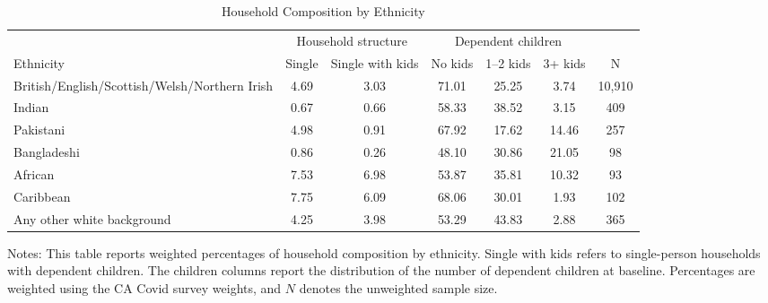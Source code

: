 \begin{table}[htbp]
\centering
\caption{Household Composition by Ethnicity}
\label{tab:ethnicity_household}
\begin{threeparttable}
\footnotesize
\begin{tabular*}{\textwidth}{@{\extracolsep{\fill}}p{5.2cm}cccccc}
\toprule
& \multicolumn{2}{c}{Household structure} & \multicolumn{3}{c}{Dependent children} & \\
\cmidrule(lr){2-3}\cmidrule(lr){4-6}
Ethnicity & Single & Single with kids & No kids & 1--2 kids & 3+ kids & N \\
\midrule
British/English/Scottish/Welsh/Northern Irish & 4.69 & 3.03 & 71.01 & 25.25 & 3.74 & 10,910 \\
Indian & 0.67 & 0.66 & 58.33 & 38.52 & 3.15 & 409 \\
Pakistani & 4.98 & 0.91 & 67.92 & 17.62 & 14.46 & 257 \\
Bangladeshi & 0.86 & 0.26 & 48.10 & 30.86 & 21.05 & 98 \\
African & 7.53 & 6.98 & 53.87 & 35.81 & 10.32 & 93 \\
Caribbean & 7.75 & 6.09 & 68.06 & 30.01 & 1.93 & 102 \\
Any other white background & 4.25 & 3.98 & 53.29 & 43.83 & 2.88 & 365 \\
\bottomrule
\end{tabular*}
\begin{tablenotes}[flushleft]
\footnotesize
\item Notes: This table reports weighted percentages of household composition by ethnicity. Single with kids refers to single-person households with dependent children. The children columns report the distribution of the number of dependent children at baseline. Percentages are weighted using the CA Covid survey weights, and \(N\) denotes the unweighted sample size.
\end{tablenotes}
\end{threeparttable}
\end{table}